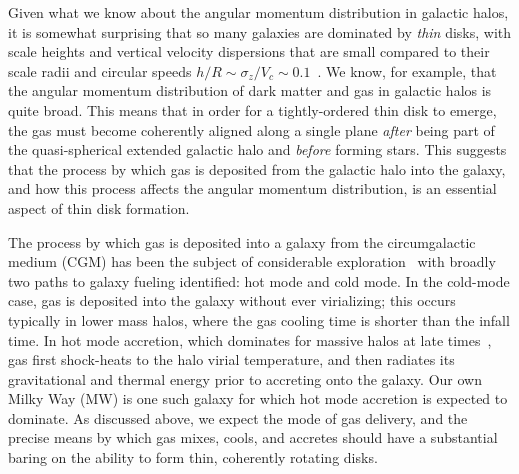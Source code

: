 \documentclass[fleqn,usenatbib]{mnras}
\begin{document}
Given what we know about the angular momentum distribution in galactic halos, it is somewhat surprising that so many galaxies are dominated by {\em thin} disks, with  scale heights and vertical velocity dispersions that are small compared to their scale radii and circular speeds $h/R \sim \sigma_z/V_c \sim 0.1$~\citep[][]{Kregel2002}.
We know, for example, that the angular momentum distribution of dark matter \citep{Bullock2001,Lian2018} and gas \citep{Stewart2013,DeFelippis2020} in galactic halos is quite broad.
This means that in order for a tightly-ordered thin disk to emerge, the gas must become coherently aligned along a single plane \textit{after} being part of the quasi-spherical extended galactic halo and \textit{before} forming stars.
This suggests that the process by which gas is deposited from the galactic halo into the galaxy, and how this process affects the angular momentum distribution, is an essential aspect of thin disk formation.

The process by which gas is deposited into a galaxy from the circumgalactic medium (CGM) has been the subject of considerable exploration~\citep[e.g.][]{Keres2005, Dekel2006, Keres2009, Angles-Alcazar2017, Martin2019a} with broadly two paths to galaxy fueling identified: hot mode and cold mode.
In the cold-mode case, gas is deposited into the galaxy without ever virializing; this occurs typically in lower mass halos, where the gas cooling time is shorter than the infall time.
In hot mode accretion, which dominates for massive halos at late times~\citep[e.g.][]{VandeVoort2011, VandeVoort2012a, Joung2012, Murante2012, Nelson2013}, gas first shock-heats to the halo virial temperature, and then radiates its gravitational and thermal energy prior to accreting onto the galaxy.
Our own Milky Way (MW) is one such galaxy for which hot mode accretion is expected to dominate.
As discussed above, we expect the mode of gas delivery, and the precise means by which gas mixes, cools, and accretes should have a substantial baring on the ability to form thin, coherently rotating disks.  
\end{document}
